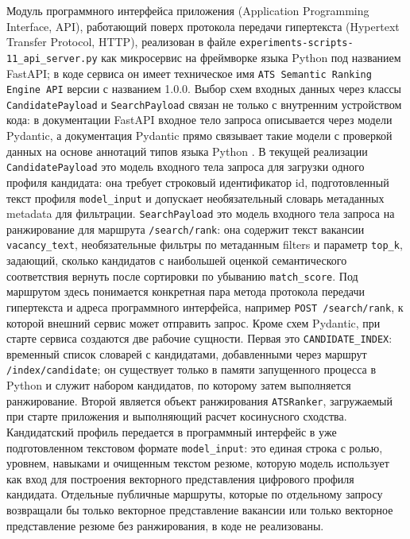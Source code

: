 Модуль программного интерфейса приложения (Application Programming Interface, API), работающий поверх протокола передачи гипертекста (Hypertext Transfer Protocol, HTTP), реализован в файле \texttt{experiments-scripts-11\_api\_server.py} как микросервис на фреймворке языка Python под названием FastAPI; в коде сервиса он имеет техническое имя \texttt{ATS Semantic Ranking Engine API} версии с названием 1.0.0. Выбор схем входных данных через классы \texttt{CandidatePayload} и \texttt{SearchPayload} связан не только с внутренним устройством кода: в документации FastAPI входное тело запроса описывается через модели Pydantic, а документация Pydantic прямо связывает такие модели с проверкой данных на основе аннотаций типов языка Python \cite{src48, src49}. В текущей реализации \texttt{CandidatePayload} это модель входного тела запроса для загрузки одного профиля кандидата: она требует строковый идентификатор id, подготовленный текст профиля \texttt{model\_input} и допускает необязательный словарь метаданных metadata для фильтрации. \texttt{SearchPayload} это модель входного тела запроса на ранжирование для маршрута \texttt{{\slash}search{\slash}rank}: она содержит текст вакансии \texttt{vacancy\_text}, необязательные фильтры по метаданным filters и параметр \texttt{top\_k}, задающий, сколько кандидатов с наибольшей оценкой семантического соответствия вернуть после сортировки по убыванию \texttt{match\_score}. Под маршрутом здесь понимается конкретная пара метода протокола передачи гипертекста и адреса программного интерфейса, например \texttt{POST {\slash}search{\slash}rank}, к которой внешний сервис может отправить запрос. Кроме схем Pydantic, при старте сервиса создаются две рабочие сущности. Первая это \texttt{CANDIDATE\_INDEX}: временный список словарей с кандидатами, добавленными через маршрут \texttt{{\slash}index{\slash}candidate}; он существует только в памяти запущенного процесса в Python и служит набором кандидатов, по которому затем выполняется ранжирование. Второй является объект ранжирования \texttt{ATSRanker}, загружаемый при старте приложения и выполняющий расчет косинусного сходства. Кандидатский профиль передается в программный интерфейс в уже подготовленном текстовом формате \texttt{model\_input}: это единая строка с ролью, уровнем, навыками и очищенным текстом резюме, которую модель использует как вход для построения векторного представления цифрового профиля кандидата. Отдельные публичные маршруты, которые по отдельному запросу возвращали бы только векторное представление вакансии или только векторное представление резюме без ранжирования, в коде не реализованы.

